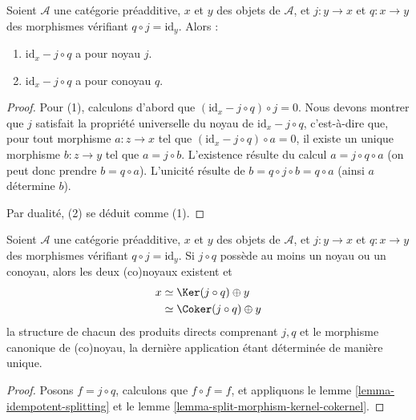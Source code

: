 \begin{lemma}
\label{lemma-split-morphism-kernel-cokernel}
Soient $\mathcal{A}$ une catégorie préadditive,
$x$ et $y$ des objets de $\mathcal{A}$,
et $j : y \to x$ et $q : x \to y$ des morphismes
vérifiant $q \circ j = \text{id} _ y$.
Alors :
\begin{enumerate}
\item $\text{id} _ x - j \circ q$ a pour noyau $j$.
\item $\text{id} _ x - j \circ q$ a pour conoyau $q$.
\end{enumerate}
\end{lemma}

\begin{proof}
Pour (1), calculons d'abord que $(\text{id} _ x - j \circ q) \circ j = 0$.
Nous devons montrer que $j$ satisfait la propriété universelle
du noyau de $\text{id} _ {x} - j \circ q$,
c'est-à-dire que, pour tout morphisme $a : z \to x$
tel que $(\text{id} _ x - j \circ q) \circ a = 0$,
il existe un unique morphisme $b : z \to y$
tel que $a = j \circ b$.
L'existence résulte du calcul $a = j \circ q \circ a$
(on peut donc prendre $b = q \circ a$).
L'unicité résulte de $b = q \circ j \circ b = q \circ a$
(ainsi $a$ détermine $b$).

\medskip\noindent
Par dualité, (2) se déduit comme (1).
\end{proof}

\begin{lemma}
\label{lemma-split-morphism-splitting}
Soient $\mathcal{A}$ une catégorie préadditive,
$x$ et $y$ des objets de $\mathcal{A}$,
et $j : y \to x$ et $q : x \to y$ des morphismes
vérifiant $q \circ j = \text{id} _ y$.
Si $j \circ q$ possède au moins un noyau ou un conoyau,
alors les deux (co)noyaux existent et
\begin{align*}
x
& \simeq \Ker (j \circ q) \oplus y \\
& \simeq \Coker (j \circ q) \oplus y
\end{align*}
la structure de chacun des produits directs comprenant $j , q$
et le morphisme canonique de (co)noyau,
la dernière application étant déterminée de manière unique.
\end{lemma}

\begin{proof}
Posons $f = j \circ q$,
calculons que $f \circ f = f$,
et appliquons le lemme \ref{lemma-idempotent-splitting}
et le lemme \ref{lemma-split-morphism-kernel-cokernel}.
\end{proof}




